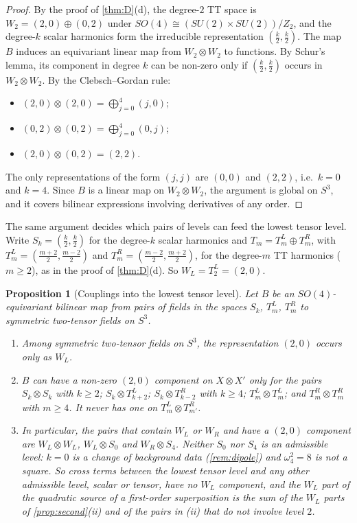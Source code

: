 \documentclass[11pt]{article}
\theoremstyle{canonmath}
\theoremstyle{canonpostulate}
\theoremstyle{canonproposition}
\theoremstyle{canonmath}
\newtheorem{proposition*}[theorem]{Proposition}
\theoremstyle{canonproposition}
\providecommand{\Ztwo}{\mathbb{Z}_2}
\def\mathbb#1{#1}%
\begin{document}
\begin{proof}
By the proof of \cref{thm:D}(d), the degree-$2$ TT space is $W_2 = (2,0)\oplus(0,2)$ under $SO(4)\cong(SU(2)\times SU(2))/\Ztwo$, and the degree-$k$ scalar harmonics form the irreducible representation $(\tfrac k2,\tfrac k2)$. The map $B$ induces an equivariant linear map from $W_2\otimes W_2$ to functions. By Schur's lemma, its component in degree $k$ can be non-zero only if $(\tfrac k2,\tfrac k2)$ occurs in $W_2\otimes W_2$. By the Clebsch--Gordan rule:
\begin{itemize}
\item $(2,0)\otimes(2,0) = \bigoplus_{j=0}^4(j,0)$;
\item $(0,2)\otimes(0,2) = \bigoplus_{j=0}^4(0,j)$;
\item $(2,0)\otimes(0,2) = (2,2)$.
\end{itemize}
The only representations of the form $(j,j)$ are $(0,0)$ and $(2,2)$, i.e.\ $k = 0$ and $k = 4$. Since $B$ is a linear map on $W_2\otimes W_2$, the argument is global on $S^3$, and it covers bilinear expressions involving derivatives of any order.
\end{proof}

The same argument decides which pairs of levels can feed the lowest tensor level. Write $S_k = (\tfrac k2,\tfrac k2)$ for the degree-$k$ scalar harmonics and $T_m = T^L_m\oplus T^R_m$, with $T^L_m = (\tfrac{m+2}2,\tfrac{m-2}2)$ and $T^R_m = (\tfrac{m-2}2,\tfrac{m+2}2)$, for the degree-$m$ TT harmonics ($m\ge2$), as in the proof of \cref{thm:D}(d). So $W_L = T^L_2 = (2,0)$.

\begin{proposition*}[Couplings into the lowest tensor level]\label{prop:coupling}
Let $B$ be an $SO(4)$-equivariant bilinear map from pairs of fields in the spaces $S_k$, $T^L_m$, $T^R_m$ to symmetric two-tensor fields on $S^3$.
\begin{enumerate}[label=(\roman*)]
\item Among symmetric two-tensor fields on $S^3$, the representation $(2,0)$ occurs only as $W_L$.
\item $B$ can have a non-zero $(2,0)$ component on $X\otimes X'$ only for the pairs $S_k\otimes S_k$ with $k\ge2$; $S_k\otimes T^L_{k+2}$; $S_k\otimes T^R_{k-2}$ with $k\ge4$; $T^L_m\otimes T^L_m$; and $T^R_m\otimes T^R_m$ with $m\ge4$. It never has one on $T^L_m\otimes T^R_{m'}$.
\item In particular, the pairs that contain $W_L$ or $W_R$ and have a $(2,0)$ component are $W_L\otimes W_L$, $W_L\otimes S_0$ and $W_R\otimes S_4$. Neither $S_0$ nor $S_4$ is an admissible level: $k=0$ is a change of background data (\cref{rem:dipole}) and $\omega_4^2 = 8$ is not a square. So cross terms between the lowest tensor level and any other admissible level, scalar or tensor, have no $W_L$ component, and the $W_L$ part of the quadratic source of a first-order superposition is the sum of the $W_L$ parts of \cref{prop:second}(ii) and of the pairs in (ii) that do not involve level $2$.
\end{enumerate}
\end{proposition*}
\end{document}
